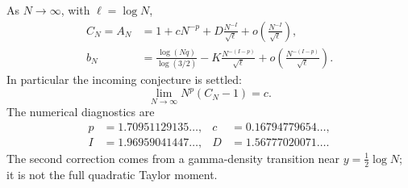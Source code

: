 \begin{theorem}
\label{lateaxis:thm:sharpasymptotic}
As $N\to\infty$, with $\ell=\log N$,
\begin{align}
 C_N=A_N
 &=1+cN^{-p}
     +D\frac{N^{-I}}{\sqrt\ell}
     +o\left(\frac{N^{-I}}{\sqrt\ell}\right),
 \label{lateaxis:eq:second}\\
 b_N
 &=\frac{\log(Nq)}{\log(3/2)}
   -K\frac{N^{-(I-p)}}{\sqrt\ell}
   +o\left(\frac{N^{-(I-p)}}{\sqrt\ell}\right).
 \label{lateaxis:eq:location}
\end{align}
In particular the incoming conjecture is settled:
\[
 \lim_{N\to\infty}N^p(C_N-1)=c.
\]
The numerical diagnostics are
\begin{align*}
 p&=1.70951129135\ldots,& c&=0.16794779654\ldots,\\
 I&=1.96959041447\ldots,& D&=1.56777020071\ldots.
\end{align*}
The second correction comes from a gamma-density transition near
$y=\frac12\log N$; it is not the full quadratic Taylor moment.
\end{theorem}
